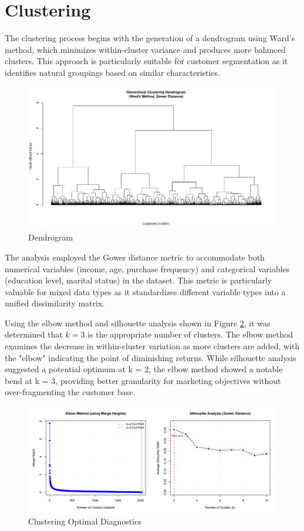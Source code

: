 \section{Clustering}
The clustering process begins with the generation of a dendrogram using Ward's method, which minimizes within-cluster variance and produces more balanced clusters. This approach is particularly suitable for customer segmentation as it identifies natural groupings based on similar characteristics.

\begin{figure}[H]
    \centering
    \includegraphics[width=1\linewidth]{Imatges/dendrogram_Gower_Ward.pdf}
    \caption{Dendrogram}
    \label{fig:dend}
\end{figure}

The analysis employed the Gower distance metric to accommodate both numerical variables (income, age, purchase frequency) and categorical variables (education level, marital status) in the dataset. This metric is particularly valuable for mixed data types as it standardizes different variable types into a unified dissimilarity matrix.

Using the elbow method and silhouette analysis shown in Figure \ref{fig:optdig}, it was determined that $k = 3$ is the appropriate number of clusters. The elbow method examines the decrease in within-cluster variation as more clusters are added, with the "elbow" indicating the point of diminishing returns. While silhouette analysis suggested a potential optimum at k = 2, the elbow method showed a notable bend at k = 3, providing better granularity for marketing objectives without over-fragmenting the customer base.

\begin{figure}[H]
    \centering
    \includegraphics[width=1\linewidth]{Imatges/Clustering_OptimalK_Diagnostics_Gower.pdf}
    \caption{Clustering Optimal Diagnostics}
    \label{fig:optdig}
\end{figure}

